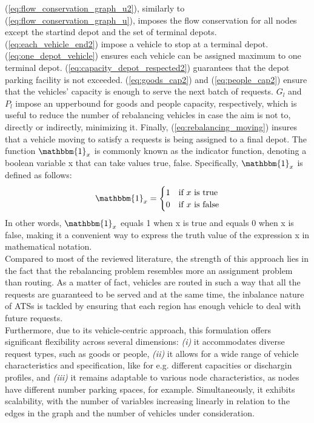 (\ref{eq:flow_conservation_graph_u2}), similarly to (\ref{eq:flow_conservation_graph_u}), imposes the flow conservation for all nodes except the startind depot and the set of terminal depots. (\ref{eq:each_vehicle_end2}) impose a vehicle to stop at a terminal depot.  (\ref{eq:one_depot_vehicle}) ensures each vehicle can be assigned maximum to one terminal depot. (\ref{eq:capacity_depot_respected2}) guarantees that the depot parking facility is not exceeded. (\ref{eq:goods_cap2}) and (\ref{eq:people_cap2}) ensure that the vehicles' capacity is enough to serve the next batch of requests. $G_{l}$ and $P_l$ impose an upperbound for goods and people capacity, respectively, which is useful to reduce the number of rebalancing vehicles in case the aim is not to, directly or indirectly, minimizing it. Finally, (\ref{eq:rebalancing_moving}) insures that a vehicle moving to satisfy a requests is being assigned to a final depot. The function $\mathbbm{1}_x$ is commonly known as the indicator function, denoting a boolean variable x that can take values {true, false}. Specifically, $\mathbbm{1}_x$ is defined as follows:
\begin{equation}
	\mathbbm{1}_x = \begin{cases}
		1 & \text{if } x \text{ is true} \\
		0 & \text{if } x \text{ is false}
	\end{cases}
\end{equation}
In other words, $\mathbbm{1}_x$ equals 1 when x is true and equals 0 when x is false, making it a convenient way to express the truth value of the expression x in mathematical notation.\\
Compared to most of the reviewed literature, the strength of this approach lies in the fact that the rebalancing problem resembles more an assignment problem than routing. As a matter of fact, vehicles are routed in such a way that all the requests are guaranteed to be served and at the same time, the inbalance nature of ATSs is tackled by ensuring that each region has enough vehicle to deal with future requests. \\
Furthermore, due to its vehicle-centric approach, this formulation offers significant flexibility across several dimensions: \textit{(i)} it accommodates diverse request types, such as goods or people, \textit{(ii)} it allows for a wide range of vehicle characteristics and specification, like for e.g. different capacities or dischargin profiles, and \textit{(iii)} it remains adaptable to various node characteristics, as nodes have different number parking spaces, for example. Simultaneously, it exhibits scalability, with the number of variables increasing linearly in relation to the edges in the graph and the number of vehicles under consideration.\\
